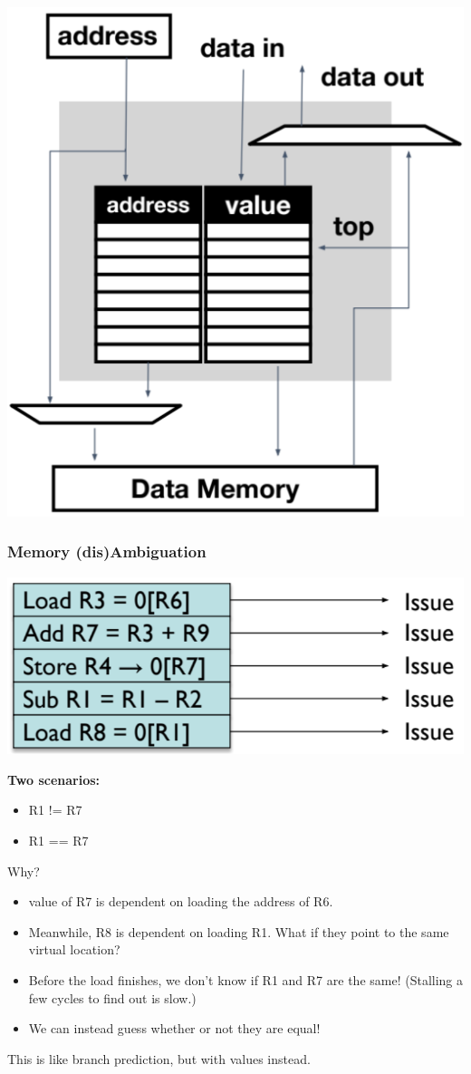 \documentclass[10pt]{article}
\begin{document}
\begin{center}
    \includegraphics*[scale=0.7]{W6_3.png}
\end{center}
\subsubsection*{Memory (dis)Ambiguation}
\begin{center}
    \includegraphics*[scale=0.8]{W6_4.png}
\end{center}
\textbf{Two scenarios:}
\begin{itemize}
    \item R1 != R7
    \item R1 == R7
\end{itemize}
Why?
\begin{itemize}
    \item value of R7 is dependent on loading the address of R6.
    \item Meanwhile, R8 is dependent on loading R1.  What if they point to the same virtual location?
    \item Before the load finishes, we don't know if R1 and R7 are the same!  (Stalling a few cycles to find out is slow.)
    \item We can instead guess whether or not they are equal!
\end{itemize}
This is like branch prediction, but with values instead.
\end{document}
